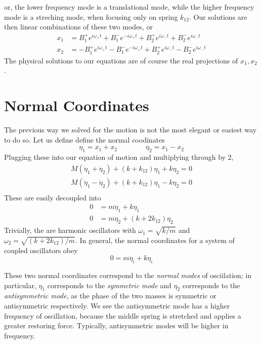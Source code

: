 or, the lower frequency mode is a translational mode, while the higher frequency mode is a streching mode, when focusing only on spring \(k_{12}\). Our solutions are then linear combinations of these two modes, or
\begin{subequations}
	\begin{align}
		x_1&= B_1^+ e^{i\omega_+t}+B_1^-e^{-i\omega_+ t}+ B_2^+ e^{i\omega_-t}+B_2^-e^{i\omega_- t}\\
		x_2&= -B_1^+ e^{i\omega_+t}-B_1^-e^{-i\omega_+ t}+ B_2^+ e^{i\omega_-t}-B_2^-e^{i\omega_- t}
	\end{align}
\end{subequations}
The physical solutions to our equations are of course the real projections of \(x_1,x_2\).

\section{Normal Coordinates}
The previous way we solved for the motion is not the most elegant or easiest way to do so. Let us define define the normal coodinates
\begin{equation}
	\eta_1 = x_1+x_2\qquad\qquad\eta_2 = x_1-x_2
\end{equation}
Plugging these into our equation of motion and multiplying through by 2, 
\begin{align*}
	M(\ddot \eta_1+\ddot \eta_2)+(k+k_{12})\eta_1+k\eta_2=0\\
	M(\ddot \eta_1-\ddot \eta_2)+(k+k_{12})\eta_1-k\eta_2=0\\
\end{align*}
These are easily decoupled into 
\begin{subequations}
	\begin{align*}
		0&=m\ddot \eta_1 + k\eta_1\\
		0&=m\ddot \eta_2 + (k+2k_{12})\eta_2
	\end{align*}
\end{subequations}
Trivially, the are harmonic oscillators with \(\omega_1 = \sqrt{k/m}\) and \(\omega_2 = \sqrt{(k+2k_{12})/m}\). In general, the normal coordinates for a system of coupled oscillators obey
\[0=m\ddot \eta_i + k\eta_i\]

These two normal coordinates correspond to the \emph{normal modes} of osciilation; in particular, \(\eta_1\) corresponds to the \emph{symmetric mode} and \(\eta_2\) corresponds to the \emph{antisymmetric mode}, as the phase of the two masses is symmetric or antisymmetric respectively. We see the antisymmetric mode has a higher frequency of oscillation, because the middle spring is stretched and applies a greater restoring force. Typically, antisymmetric modes will be higher in frequency.

